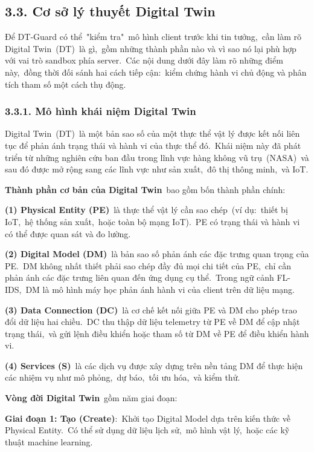 \subsection{3.3. Cơ sở lý thuyết Digital Twin}\label{cux1a1-sux1edf-luxfd-thuyux1ebft-digital-twin}

Để DT-Guard có thể~"kiểm tra"~mô hình client trước khi tin tưởng,~cần làm rõ Digital Twin~(DT)~là gì,~gồm những thành phần nào và vì sao nó lại phù hợp với vai trò sandbox phía server.~Các nội dung dưới đây làm rõ những điểm này,~đồng thời đối sánh hai cách tiếp cận:~kiểm chứng hành vi chủ động và phân tích tham số một cách thụ động.

\subsubsection{3.3.1. Mô hình khái niệm Digital Twin}\label{muxf4-huxecnh-khuxe1i-niux1ec7m-digital-twin}

Digital Twin~(DT)~là một bản sao số của một thực thể vật lý được kết nối liên tục để phản ánh trạng thái và hành vi của thực thể đó.~Khái niệm này đã phát triển từ những nghiên cứu ban đầu trong lĩnh vực hàng không vũ trụ~(NASA)~và sau đó được mở rộng sang các lĩnh vực như sản xuất,~đô thị thông minh,~và IoT.

\textbf{Thành phần cơ bản của Digital Twin}~bao gồm bốn thành phần chính:

\textbf{(1) Physical Entity (PE)}~là thực thể vật lý cần sao chép~(ví dụ:~thiết bị IoT,~hệ thống sản xuất,~hoặc toàn bộ mạng IoT).~PE có trạng thái và hành vi có thể được quan sát và đo lường.

\textbf{(2) Digital Model (DM)}~là bản sao số phản ánh các đặc trưng quan trọng của PE.~DM không nhất thiết phải sao chép đầy đủ mọi chi tiết của PE,~chỉ cần phản ánh các đặc trưng liên quan đến ứng dụng cụ thể.~Trong ngữ cảnh FL-IDS,~DM là mô hình máy học phản ánh hành vi của client trên dữ liệu mạng.

\textbf{(3) Data Connection (DC)}~là cơ chế kết nối giữa PE và DM cho phép trao đổi dữ liệu hai chiều.~DC thu thập dữ liệu telemetry từ PE về DM để cập nhật trạng thái,~và gửi lệnh điều khiển hoặc tham số từ DM về PE để điều khiển hành vi.

\textbf{(4) Services (S)}~là các dịch vụ được xây dựng trên nền tảng DM để thực hiện các nhiệm vụ như mô phỏng,~dự báo,~tối ưu hóa,~và kiểm thử.

\textbf{Vòng đời Digital Twin}~gồm năm giai đoạn:

\textbf{Giai đoạn 1: Tạo (Create)}:~Khởi tạo Digital Model dựa trên kiến thức về Physical Entity.~Có thể sử dụng dữ liệu lịch sử,~mô hình vật lý,~hoặc các kỹ thuật machine learning.

